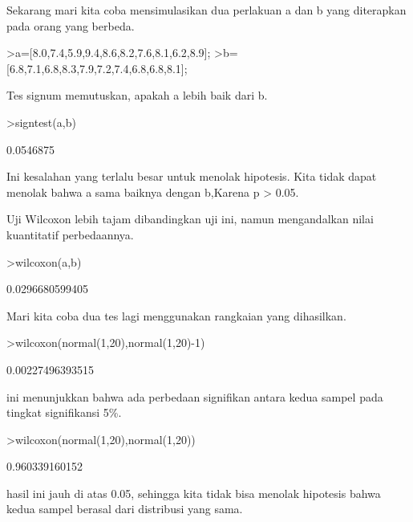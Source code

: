 \documentclass{article}
\begin{document}
\begin{eulernotebook}
\begin{eulercomment}
\begin{eulercomment}
\begin{eulercomment}
\begin{eulercomment}
\begin{eulercomment}
Sekarang mari kita coba mensimulasikan dua perlakuan a dan b yang
diterapkan pada orang yang berbeda.
\end{eulercomment}
\begin{eulerprompt}
>a=[8.0,7.4,5.9,9.4,8.6,8.2,7.6,8.1,6.2,8.9];
>b=[6.8,7.1,6.8,8.3,7.9,7.2,7.4,6.8,6.8,8.1];
\end{eulerprompt}
\begin{eulercomment}
Tes signum memutuskan, apakah a lebih baik dari b.
\end{eulercomment}
\begin{eulerprompt}
>signtest(a,b)
\end{eulerprompt}
\begin{euleroutput}
  0.0546875
\end{euleroutput}
\begin{eulercomment}
Ini kesalahan yang terlalu besar untuk menolak hipotesis. Kita tidak
dapat menolak bahwa a sama baiknya dengan b,Karena p \textgreater{} 0.05.

Uji Wilcoxon lebih tajam dibandingkan uji ini, namun mengandalkan
nilai kuantitatif perbedaannya.
\end{eulercomment}
\begin{eulerprompt}
>wilcoxon(a,b)
\end{eulerprompt}
\begin{euleroutput}
  0.0296680599405
\end{euleroutput}
\begin{eulercomment}
Mari kita coba dua tes lagi menggunakan rangkaian yang dihasilkan.
\end{eulercomment}
\begin{eulerprompt}
>wilcoxon(normal(1,20),normal(1,20)-1)
\end{eulerprompt}
\begin{euleroutput}
  0.00227496393515
\end{euleroutput}
\begin{eulercomment}
ini menunjukkan bahwa ada perbedaan signifikan antara kedua sampel
pada tingkat signifikansi 5\%.
\end{eulercomment}
\begin{eulerprompt}
>wilcoxon(normal(1,20),normal(1,20))
\end{eulerprompt}
\begin{euleroutput}
  0.960339160152
\end{euleroutput}
\begin{eulercomment}
hasil ini  jauh di atas 0.05, sehingga kita tidak bisa menolak
hipotesis bahwa kedua sampel berasal dari distribusi yang sama.


\end{eulercomment}
\end{eulercomment}
\end{eulercomment}
\end{eulercomment}
\end{eulercomment}
\end{eulernotebook}
\end{document}

